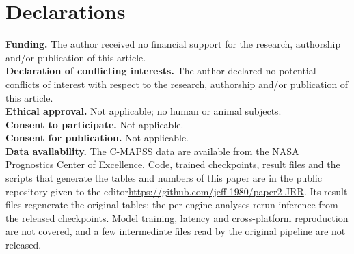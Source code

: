 \section*{Declarations}
\noindent\textbf{Funding.} The author received no financial support for the research, authorship and/or publication of this article.\\[2pt]
\noindent\textbf{Declaration of conflicting interests.} The author declared no potential conflicts of interest with respect to the research, authorship and/or publication of this article.\\[2pt]
\noindent\textbf{Ethical approval.} Not applicable; no human or animal subjects.\\[2pt]
\noindent\textbf{Consent to participate.} Not applicable.\\[2pt]
\noindent\textbf{Consent for publication.} Not applicable.\\[2pt]
\noindent\textbf{Data availability.} The C-MAPSS data are available from the NASA Prognostics Center of Excellence. Code, trained checkpoints, result files and the scripts that generate the tables and numbers of this paper are in the public repository \ifanon given to the editor\else\url{https://github.com/jeff-1980/paper2-JRR}\fi. Its result files regenerate the original tables; the per-engine analyses rerun inference from the released checkpoints. Model training, latency and cross-platform reproduction are not covered, and a few intermediate files read by the original pipeline are not released.
